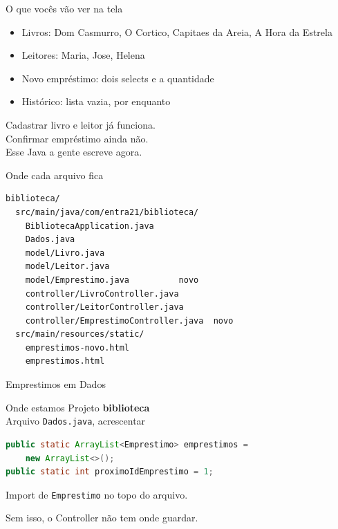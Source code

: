 \documentclass[aspectratio=169,11pt]{beamer}
\newcommand{\onde}[1]{%
  \begin{block}{Onde estamos}
    #1
  \end{block}
}
\begin{document}
\begin{frame}{O que vocês vão ver na tela}
  \begin{itemize}
    \item Livros: Dom Casmurro, O Cortico, Capitaes da Areia, A Hora da Estrela
    \item Leitores: Maria, Jose, Helena
    \item Novo empréstimo: dois selects e a quantidade
    \item Histórico: lista vazia, por enquanto
  \end{itemize}

  \vspace{0.5em}
  Cadastrar livro e leitor já funciona.\\
  Confirmar empréstimo ainda não.\\
  Esse Java a gente escreve agora.
\end{frame}

\begin{frame}[fragile]{Onde cada arquivo fica}
\begin{lstlisting}[basicstyle=\ttfamily\footnotesize]
biblioteca/
  src/main/java/com/entra21/biblioteca/
    BibliotecaApplication.java
    Dados.java
    model/Livro.java
    model/Leitor.java
    model/Emprestimo.java          novo
    controller/LivroController.java
    controller/LeitorController.java
    controller/EmprestimoController.java  novo
  src/main/resources/static/
    emprestimos-novo.html
    emprestimos.html
\end{lstlisting}
\end{frame}

\begin{frame}[fragile]{Emprestimos em Dados}
  \onde{Projeto \textbf{biblioteca}\\
        Arquivo \texttt{Dados.java}, acrescentar}

\begin{lstlisting}[language=Java,basicstyle=\ttfamily\footnotesize]
public static ArrayList<Emprestimo> emprestimos =
    new ArrayList<>();
public static int proximoIdEmprestimo = 1;
\end{lstlisting}

  \vspace{0.4em}
  Import de \texttt{Emprestimo} no topo do arquivo.

  \vspace{0.4em}
  Sem isso, o Controller não tem onde guardar.
\end{frame}
\end{document}
